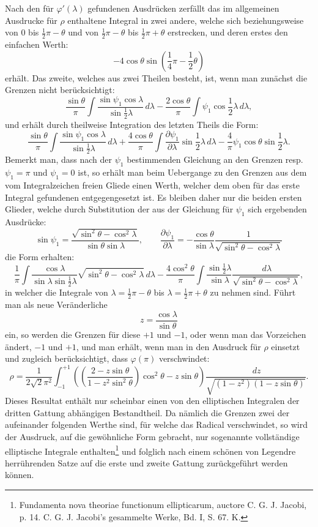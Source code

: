 \documentclass[11pt]{article}
\newcommand{\dd}{\,d}
\begin{document}
Nach den für $\varphi'(\lambda)$ gefundenen Ausdrücken zerfällt das im allgemeinen Ausdrucke für $\rho$ enthaltene Integral in zwei andere, welche sich beziehungsweise von $0$ bis $\frac12\pi-\theta$ und von $\frac12\pi-\theta$ bis $\frac12\pi+\theta$ erstrecken, und deren erstes den einfachen Werth:
\[
 -4\cos\theta\sin\left(\frac14\pi-\frac12\theta\right)
\]
erhält. Das zweite, welches aus zwei Theilen besteht, ist, wenn man zunächst die Grenzen nicht berücksichtigt:
\[
 \frac{\sin\theta}{\pi}\int\frac{\sin\psi_1\cos\lambda}{\sin\frac12\lambda}\dd\lambda
 -\frac{2\cos\theta}{\pi}\int\psi_1\cos\frac12\lambda\dd\lambda,
\]
und erhält durch theilweise Integration des letzten Theils die Form:
\[
 \frac{\sin\theta}{\pi}\int\frac{\sin\psi_1\cos\lambda}{\sin\frac12\lambda}\dd\lambda
 +\frac{4\cos\theta}{\pi}\int\frac{\partial\psi_1}{\partial\lambda}\sin\frac12\lambda\dd\lambda
 -\frac4\pi\psi_1\cos\theta\sin\frac12\lambda.
\]
Bemerkt man, dass nach der $\psi_1$ bestimmenden Gleichung an den Grenzen resp. $\psi_1=\pi$ und $\psi_1=0$ ist, so erhält man beim Uebergange zu den Grenzen aus dem vom Integralzeichen freien Gliede einen Werth, welcher dem oben für das erste Integral gefundenen entgegengesetzt ist. Es bleiben daher nur die beiden ersten Glieder, welche durch Substitution der aus der Gleichung für $\psi_1$ sich ergebenden Ausdrücke:
\[
 \sin\psi_1=\frac{\sqrt{\sin^2\theta-\cos^2\lambda}}{\sin\theta\sin\lambda},
\qquad
 \frac{\partial\psi_1}{\partial\lambda}=-\frac{\cos\theta}{\sin\lambda}\frac1{\sqrt{\sin^2\theta-\cos^2\lambda}}
\]
die Form erhalten:
\[
 \frac1\pi\int\frac{\cos\lambda}{\sin\lambda\sin\frac12\lambda}\sqrt{\sin^2\theta-\cos^2\lambda}\dd\lambda
 -\frac{4\cos^2\theta}{\pi}\int\frac{\sin\frac12\lambda}{\sin\lambda}\frac{\dd\lambda}{\sqrt{\sin^2\theta-\cos^2\lambda}},
\]
in welcher die Integrale von $\lambda=\frac12\pi-\theta$ bis $\lambda=\frac12\pi+\theta$ zu nehmen sind. Führt man als neue Veränderliche
\[
 z=\frac{\cos\lambda}{\sin\theta}
\]
ein, so werden die Grenzen für diese $+1$ und $-1$, oder wenn man das Vorzeichen ändert, $-1$ und $+1$, und man erhält, wenn man in den Ausdruck für $\rho$ einsetzt und zugleich berücksichtigt, dass $\varphi(\pi)$ verschwindet:
\[
 \rho=\frac{1}{2\sqrt2\pi^2}\int_{-1}^{+1}\left(\left(\frac{2-z\sin\theta}{1-z^2\sin^2\theta}\right)\cos^2\theta-z\sin\theta\right)
 \frac{\dd z}{\sqrt{(1-z^2)(1-z\sin\theta)}}.
\]
Dieses Resultat enthält nur scheinbar einen von den elliptischen Integralen der dritten Gattung abhängigen Bestandtheil. Da nämlich die Grenzen zwei der aufeinander folgenden Werthe sind, für welche das Radical verschwindet, so wird der Ausdruck, auf die gewöhnliche Form gebracht, nur sogenannte vollständige elliptische Integrale enthalten\footnote{Fundamenta nova theoriae functionum ellipticarum, auctore C. G. J. Jacobi, p. 14. C. G. J. Jacobi's gesammelte Werke, Bd. I, S. 67. K.} und folglich nach einem schönen von Legendre herrührenden Satze auf die erste und zweite Gattung zurückgeführt werden können.
\end{document}
